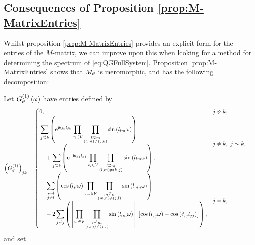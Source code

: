 \subsection{Consequences of Proposition \ref{prop:M-MatrixEntries}} \label{ssec:MMatrixConsequences}
Whilst proposition \ref{prop:M-MatrixEntries} provides an explicit form for the entries of the $M$-matrix, we can improve upon this when looking for a method for determining the spectrum of \eqref{eq:QGFullSystem}.
Proposition \ref{prop:M-MatrixEntries} shows that $M_\theta$ is meromorphic, and has the following decomposition:
\begin{cory} \label{cory:M-MatrixEntriesNoPoles}
	Let $G^{(1)}_\theta\left( \omega \right)$ have entries defined by
	\begin{align*}
		\bracs{G^{(1)}_\qm}_{jk} &= 
		\begin{cases}
			\!\begin{aligned}
				&0,
			\end{aligned}			
			& j \not\con k, \\
			\!\begin{aligned}
				&\sum_{j\conLeft k} \bracs{ \e^{\rmi\qm_{jk}l_{jk}} \prod_{v_l\in\vertSet}\prod_{\substack{ l\conLeft m \\ \bracs{l,m} \neq \bracs{j,k} }}\sin\bracs{l_{lm}\omega} }
				\\ &\quad + \sum_{j\conRight k} \bracs{ \e^{-\rmi\qm_{kj}l_{kj}} \prod_{v_l\in\vertSet}\prod_{\substack{l\conLeft m \\ \bracs{l,m} \neq \bracs{k,j} }}\sin\bracs{l_{lm}\omega} },
			\end{aligned}
			& j\neq k, \ j\con k, \\
			\!\begin{aligned}
				&- \sum_{\substack{j\con l \\ j\neq l}} \bracs{ \cos\bracs{l_{jl}\omega}\prod_{v_m\in\vertSet}\prod_{\substack{ m\conLeft n \\ \bracs{m,n}\neq\bracs{j,l} }}\sin\bracs{l_{mn}\omega} }
				\\ &\quad - 2\sum_{j\conLeft j} \bracs{ \sqbracs{ \prod_{v_l\in\vertSet}\prod_{\substack{l\conLeft m \\ \bracs{l,m}\neq\bracs{j,j} }}\sin\bracs{l_{lm}\omega} }\bigl[ \cos\bracs{l_{jj}\omega} - \cos\bracs{\qm_{jj}l_{jj}} \bigr] },
			\end{aligned}
			& j=k,
		\end{cases}
	\end{align*}
	and set
	\begin{align*}

\end{align*}
\end{cory}
